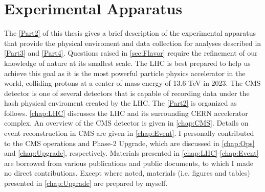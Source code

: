 \part{Experimental Apparatus}
\label{Part2}
The \autoref{Part2} of this thesis gives a brief description of the experimental apparatus that provide the physical enviroment and data collection for analyses described in \autoref{Part3} and \autoref{Part4}. Questions raised in \autoref{sec:Flavor} require the refinement of our knowledge of nature at its smallest scale. The \ac{LHC} is best prepared to help us achieve this goal as it is the most powerful particle physics accelerator in the world, colliding protons at a center-of-mass energy of 13.6 TeV in 2023. The \ac{CMS} detector is one of several detectors that is capable of recording data under the hash physical enviroment created by the \ac{LHC}. The \autoref{Part2} is organized as follows. \autoref{chap:LHC} discusses the \ac{LHC} and its surrounding \ac{CERN} accelerator complex. An overview of the \ac{CMS} detector is given in \autoref{chap:CMS}. Details on event reconstruction in \ac{CMS} are given in \autoref{chap:Event}. I personally contributed to the \ac{CMS} operations and Phase-2 Upgrade, which are discussed in \autoref{chap:Ops} and \autoref{chap:Upgrade}, respectively. Materials presented in \autoref{chap:LHC}-\autoref{chap:Event} are borrowed from various publications and public documents, to which I made no direct contributions. Except where noted, materials (i.e. figures and tables) presented in \autoref{chap:Upgrade} are prepared by myself.





